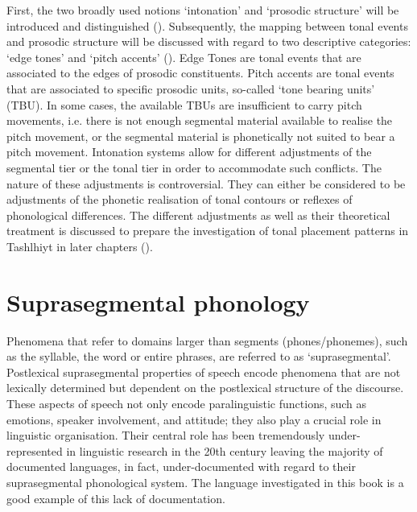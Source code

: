 First, the two broadly used notions ‘intonation’ and ‘prosodic structure’ will be introduced and distinguished (). Subsequently, the mapping between tonal events and prosodic structure will be discussed with regard to two descriptive categories: ‘edge tones’ and ‘pitch accents’ (). Edge Tones are tonal events that are associated to the edges of prosodic constituents. Pitch accents are tonal events that are associated to specific prosodic units, so-called ‘tone bearing units’ (TBU). In some cases, the available TBUs are insufficient to carry pitch movements, i.e. there is not enough segmental material available to realise the pitch movement, or the segmental material is phonetically not suited to bear a pitch movement. Intonation systems allow for different adjustments of the segmental tier or the tonal tier in order to accommodate such conflicts. The nature of these adjustments is controversial. They can either be considered to be adjustments of the phonetic realisation of tonal contours or reflexes of phonological differences. The different adjustments as well as their theoretical treatment is discussed to prepare the investigation of tonal placement patterns in Tashlhiyt in later chapters (). 


\section{Suprasegmental phonology}\label{sec:2.2}
 
Phenomena that refer to domains larger than segments (phones/phonemes), such as the syllable, the word or entire phrases, are referred to as ‘suprasegmental’. Postlexical suprasegmental properties of speech encode phenomena that are not lexically determined but dependent on the postlexical structure of the discourse. These aspects of speech not only encode paralinguistic functions, such as emotions, speaker involvement, and attitude; they also play a crucial role in linguistic organisation. Their central role has been tremendously under-represented in linguistic research in the 20th century leaving the majority of documented languages, in fact, under-documented with regard to their suprasegmental phonological system. The language investigated in this book is a good example of this lack of documentation. 

